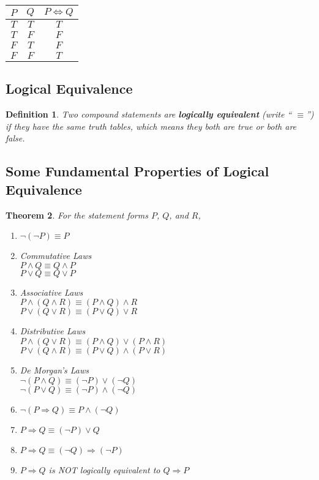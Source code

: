 \documentclass[10pt,reqno]{book}
\theoremstyle{plain}
\newtheorem{theorem}{Theorem}[section]
\newtheorem{definition}[theorem]{Definition}
\begin{document}
	\begin{center}
		\begin{tabular}{|c|c|c|}
			\hline
			$ P $ & $ Q $ & $ P \Leftrightarrow Q $ \\ \hline
			$ T $ & $ T $ &     $ T $      \\ \hline
			$ T $ & $ F $ &     $ F $      \\ \hline
			$ F $ & $ T $ &     $ F $      \\ \hline
			$ F $ & $ F $ &     $ T $      \\ \hline
		\end{tabular}
	\end{center}
	
	\subsection*{Logical Equivalence}
	
	\begin{definition}
		Two compound statements are \textbf{logically equivalent} (write `` $ \equiv $'') if they have the same truth tables, which means they both are true or both are false.
	\end{definition}
	
	\subsection*{Some Fundamental Properties of Logical Equivalence}
	
	\begin{theorem}
		For the statement forms $ P $, $ Q $, and $ R $,
		\begin{enumerate}
			\item $ \neg (\neg P) \equiv P $
			\item Commutative Laws\\
				$ P \wedge Q \equiv Q \wedge P $\\
				$ P \vee Q \equiv Q \vee P $
			\item Associative Laws\\
				$ P \wedge (Q \wedge R) \equiv (P \wedge Q) \wedge R $\\
				$ P \vee (Q \vee R) \equiv (P \vee Q) \vee R $
			\item Distributive Laws\\
				$ P \wedge (Q \vee R) \equiv (P \wedge Q) \vee (P \wedge R) $\\
				$ P \vee (Q \wedge R) \equiv (P \vee Q) \wedge (P \vee R) $
			\item De Morgan's Laws\\
				$ \neg (P \wedge Q) \equiv (\neg P) \vee (\neg Q) $\\
				$ \neg (P \vee Q) \equiv (\neg P) \wedge (\neg Q) $
			\item $ \neg (P \Rightarrow Q) \equiv P \wedge (\neg Q) $
			\item $ P \Rightarrow Q \equiv (\neg P) \vee Q $
			\item $ P \Rightarrow Q \equiv (\neg Q) \Rightarrow (\neg P) $
			\item $ P \Rightarrow Q $ is NOT logically equivalent to $ Q \Rightarrow P $
		\end{enumerate}
	\end{theorem}
\end{document}
